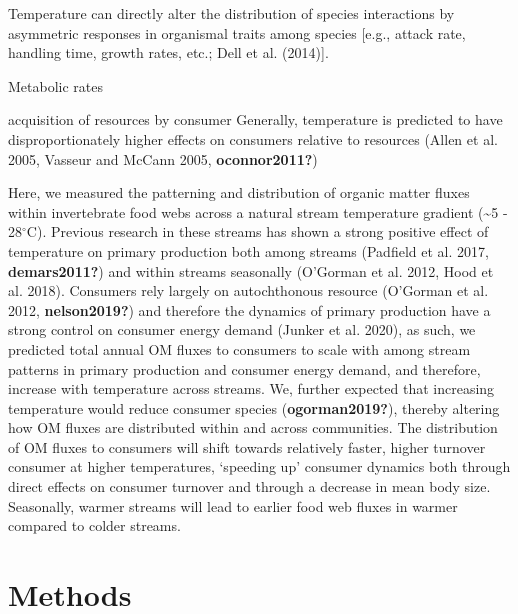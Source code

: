 \documentclass[
]{article}
\begin{document}
\par

\setlength\parindent{24pt}

Temperature can directly alter the distribution of species interactions
by asymmetric responses in organismal traits among species {[}e.g.,
attack rate, handling time, growth rates, etc.; Dell et al. (2014){]}.

Metabolic rates

acquisition of resources by consumer Generally, temperature is predicted
to have disproportionately higher effects on consumers relative to
resources (Allen et al. 2005, Vasseur and McCann 2005,
\textbf{oconnor2011?})

Here, we measured the patterning and distribution of organic matter
fluxes within invertebrate food webs across a natural stream temperature
gradient (\textasciitilde5 - 28\(^\circ\)C). Previous research in these
streams has shown a strong positive effect of temperature on primary
production both among streams (Padfield et al. 2017,
\textbf{demars2011?}) and within streams seasonally (O'Gorman et al.
2012, Hood et al. 2018). Consumers rely largely on autochthonous
resource (O'Gorman et al. 2012, \textbf{nelson2019?}) and therefore the
dynamics of primary production have a strong control on consumer energy
demand (Junker et al. 2020), as such, we predicted total annual OM
fluxes to consumers to scale with among stream patterns in primary
production and consumer energy demand, and therefore, increase with
temperature across streams. We, further expected that increasing
temperature would reduce consumer species (\textbf{ogorman2019?}),
thereby altering how OM fluxes are distributed within and across
communities. The distribution of OM fluxes to consumers will shift
towards relatively faster, higher turnover consumer at higher
temperatures, `speeding up' consumer dynamics both through direct
effects on consumer turnover and through a decrease in mean body size.
Seasonally, warmer streams will lead to earlier food web fluxes in
warmer compared to colder streams.

\hypertarget{methods}{%
\section{Methods}\label{methods}}
\end{document}
